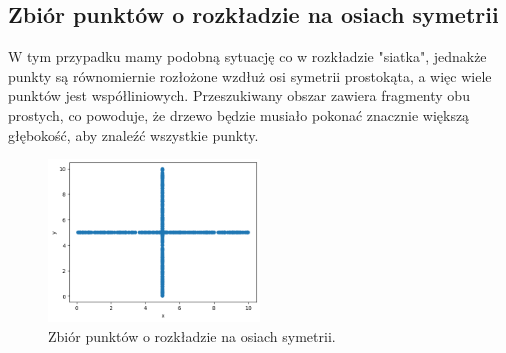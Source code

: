 \documentclass{lab}
\begin{document}
\subsection{Zbiór punktów o rozkładzie na osiach symetrii}
W tym przypadku mamy podobną sytuację co w rozkładzie "siatka", jednakże punkty są równomiernie rozłożone wzdłuż osi symetrii prostokąta, a więc wiele punktów jest współliniowych.
Przeszukiwany obszar zawiera fragmenty obu prostych, co powoduje, że drzewo będzie musiało pokonać znacznie większą głębokość, aby znaleźć wszystkie punkty.

\begin{figure}[H]
  \centering
  \includegraphics[width=0.5\textwidth]{resources/cross.png}
  \caption{Zbiór punktów o rozkładzie na osiach symetrii.}
  \label{fig:cross}
\end{figure}
\end{document}
